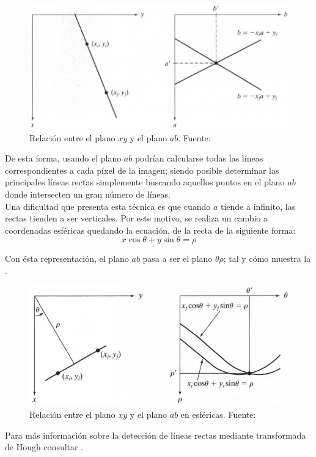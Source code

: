 \begin{figure}[!h]
\centering
\includegraphics[width=12cm]{planoab.png}
\caption{\small{Relación entre el plano $xy$ y el plano $ab$. Fuente:\cite{ImgProcessMat}}}
\label{planoab}
\end{figure}

De esta forma, usando el plano $ab$ podrían calcularse todas las líneas correspondientes a cada píxel de la imagen; siendo posible determinar las principales líneas rectas simplemente buscando aquellos puntos en el plano $ab$ donde intersecten un gran número de líneas.\\

Una dificultad que presenta esta técnica es que cuando $a$ tiende a infinito, las rectas tienden a ser verticales. Por este motivo, se realiza un cambio a coordenadas esféricas quedando la ecuación, de la recta de la siguiente forma:
\begin{equation}
x \cos{\theta} + y \sin{\theta} = \rho
\end{equation}

Con ésta representación, el plano $ab$ pasa a ser el plano $\theta\rho$; tal y cómo muestra la . \\

\begin{figure}[!h]
\centering
\includegraphics[width=12cm]{planoabesfericas.png}
\caption{\small{Relación entre el plano $xy$ y el plano $ab$ en esféricas. Fuente:\cite{ImgProcessMat}}}
\label{planoabesf}
\end{figure}


Para más información sobre la detección de líneas rectas mediante transformada de Hough consultar \cite{ImgProcess}.